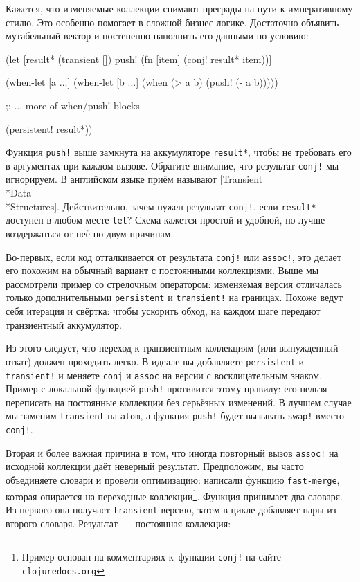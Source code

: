 Кажется, что изменяемые коллекции снимают преграды на пути к императивному
стилю. Это особенно помогает в сложной бизнес-логике. Достаточно объявить
мутабельный вектор и постепенно наполнить его данными по условию:

\begin{english}
  \begin{clojure}
(let [result* (transient [])
      push! (fn [item]
              (conj! result* item))]

  (when-let [a ...]
    (when-let [b ...]
      (when (> a b)
        (push! (- a b)))))

  ;; ... more of when/push! blocks

  (persistent! result*))
  \end{clojure}
\end{english}

Функция \verb|push!| выше замкнута на аккумуляторе \verb|result*|, чтобы не
требовать его в аргументах при каждом вызове. Обратите внимание, что результат
\verb|conj!| мы игнорируем. В английском языке приём называют
[Transient\\*Data\\*Structures].
Действительно, зачем нужен результат \verb|conj!|, если \verb|result*| доступен
в любом месте \verb|let|? Схема кажется простой и удобной, но лучше воздержаться
от неё по двум причинам.

Во-первых, если код отталкивается от результата \verb|conj!| или \verb|assoc!|,
это делает его похожим на обычный вариант с постоянными коллекциями. Выше мы
рассмотрели пример со стрелочным оператором: изменяемая версия отличалась только
дополнительными \verb|persistent| и \verb|transient!| на границах. Похоже ведут
себя итерация и свёртка: чтобы ускорить обход, на каждом шаге передают
транзиентный аккумулятор.

Из этого следует, что переход к транзиентным коллекциям (или вынужденный откат)
должен проходить легко. В идеале вы добавляете \verb|persistent| и
\verb|transient!| и меняете \verb|conj| и \verb|assoc| на версии с
восклицательным знаком. Пример с локальной функцией \verb|push!| противится
этому правилу: его нельзя переписать на постоянные коллекции без серьёзных
изменений. В лучшем случае мы заменим \verb|transient| на \verb|atom|, а функция
\verb|push!| будет вызывать \verb|swap!| вместо \verb|conj!|.

Вторая и более важная причина в том, что иногда повторный вызов \verb|assoc!| на
исходной коллекции даёт неверный результат. Предположим, вы часто объединяете
словари и провели оптимизацию: написали функцию \verb|fast-merge|, которая
опирается на переходные коллекции\footnote{Пример основан на комментариях
  к~функции \texttt{conj!} на сайте \texttt{clo\-ju\-re\-docs.org}}. Функция принимает
два словаря. Из первого она получает \verb|transient|-версию, затем в цикле
добавляет пары из второго словаря. Результат~--- постоянная коллекция:

